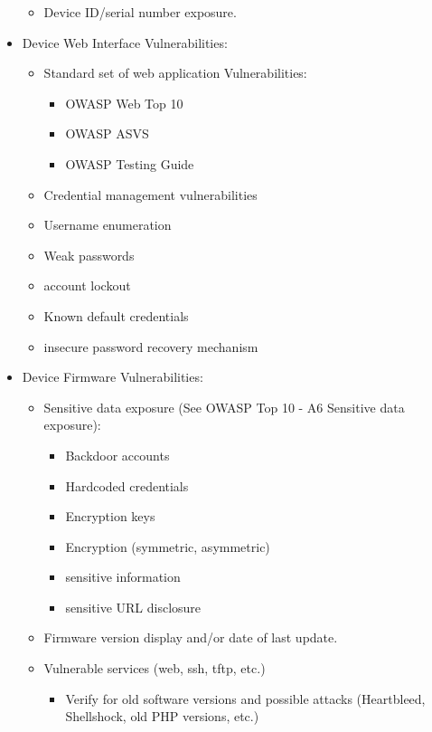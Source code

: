 \begin{itemize}
\begin{itemize}
        \item Device ID/serial number exposure.
    \end{itemize}
    \item Device Web Interface Vulnerabilities:
    \begin{itemize}
        \item Standard set of web application Vulnerabilities:
        \begin{itemize}
            \item OWASP Web Top 10
            \item OWASP ASVS
            \item OWASP Testing Guide
        \end{itemize}
        \item Credential management vulnerabilities
        \item Username enumeration
        \item Weak passwords
        \item account lockout
        \item Known default credentials
        \item insecure password recovery mechanism
    \end{itemize}
    \item Device Firmware Vulnerabilities:
    \begin{itemize}
        \item Sensitive data exposure (See OWASP Top 10 - A6 Sensitive data exposure):
        \begin{itemize}
            \item Backdoor accounts
            \item Hardcoded credentials
            \item Encryption keys
            \item Encryption (symmetric, asymmetric)
            \item sensitive information
            \item sensitive URL disclosure
        \end{itemize}
        \item Firmware version display and/or date of last update.
        \item Vulnerable services (web, ssh, tftp, etc.)
        \begin{itemize}
            \item Verify for old software versions and possible attacks (Heartbleed, Shellshock, old PHP versions, etc.)
        \end{itemize}

\end{itemize}
\end{itemize}
